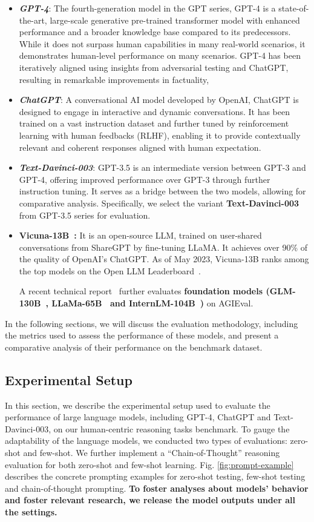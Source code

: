\begin{itemize}
\item \textbf{\textit{GPT-4}}: The fourth-generation model in the GPT series, GPT-4 is a state-of-the-art, large-scale generative pre-trained transformer model with enhanced performance and a broader knowledge base compared to its predecessors. While it does not surpass human capabilities in many real-world scenarios, it demonstrates human-level performance on many scenarios. GPT-4 has been iteratively aligned using insights from adversarial testing and ChatGPT, resulting in remarkable improvements in factuality, \item \textbf{\textit{ChatGPT}}: A conversational AI model developed by OpenAI, ChatGPT is designed to engage in interactive and dynamic conversations. It has been trained on a vast instruction dataset and further tuned by reinforcement learning with human feedbacks (RLHF), enabling it to provide contextually relevant and coherent responses aligned with human expectation.
\item \textbf{\textit{Text-Davinci-003}}: GPT-3.5 is an intermediate version between GPT-3 and GPT-4, offering improved performance over GPT-3 through further instruction tuning. It serves as a bridge between the two models, allowing for comparative analysis. Specifically, we select the variant \textbf{Text-Davinci-003} from GPT-3.5 series for evaluation.
\item \textbf{Vicuna-13B~\citep{vicuna2023}: }It is an open-source LLM, trained on user-shared conversations from ShareGPT by fine-tuning LLaMA. It achieves over 90\% of the quality of OpenAI's ChatGPT. As of May 2023, Vicuna-13B ranks among the top models on the Open LLM Leaderboard~\citep{open-llm-leaderboard}.

A recent technical report~\citep{InternLM} further evaluates \textbf{foundation models (GLM-130B~\citep{du2022glm}, LLaMa-65B~\citep{touvron2023llama} and InternLM-104B~\citep{InternLM})} on AGIEval.
\end{itemize}

In the following sections, we will discuss the evaluation methodology, including the metrics used to assess the performance of these models, and present a comparative analysis of their performance on the benchmark dataset.

\subsection{Experimental Setup} In this section, we describe the experimental setup used to evaluate the performance of large language models, including GPT-4, ChatGPT and Text-Davinci-003, on our human-centric reasoning tasks benchmark. To gauge the adaptability of the language models, we conducted two types of evaluations: zero-shot and few-shot. We further implement a ``Chain-of-Thought'' reasoning evaluation for both zero-shot and few-shot learning. Fig. \ref{fig:prompt-example} describes the concrete prompting examples for zero-shot testing, few-shot testing and chain-of-thought prompting.
\textbf{To foster analyses about models' behavior and foster relevant research, we release the model outputs under all the settings.}

